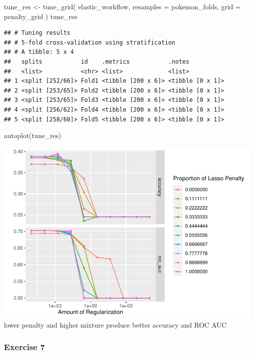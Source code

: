 \documentclass[
]{article}
\newenvironment{Shaded}{\begin{snugshade}}{\end{snugshade}}
\newcommand{\AttributeTok}[1]{\textcolor[rgb]{0.77,0.63,0.00}{#1}}
\newcommand{\FunctionTok}[1]{\textcolor[rgb]{0.00,0.00,0.00}{#1}}
\newcommand{\NormalTok}[1]{#1}
\newcommand{\OtherTok}[1]{\textcolor[rgb]{0.56,0.35,0.01}{#1}}
\begin{document}
\begin{Shaded}
\begin{Highlighting}[]
\NormalTok{tune\_res }\OtherTok{\textless{}{-}} \FunctionTok{tune\_grid}\NormalTok{(}
\NormalTok{  elastic\_workflow,}
  \AttributeTok{resamples =}\NormalTok{ pokemon\_folds, }
  \AttributeTok{grid =}\NormalTok{ penalty\_grid}
\NormalTok{)}
\NormalTok{tune\_res}
\end{Highlighting}
\end{Shaded}

\begin{verbatim}
## # Tuning results
## # 5-fold cross-validation using stratification 
## # A tibble: 5 x 4
##   splits           id    .metrics           .notes          
##   <list>           <chr> <list>             <list>          
## 1 <split [252/66]> Fold1 <tibble [200 x 6]> <tibble [0 x 1]>
## 2 <split [253/65]> Fold2 <tibble [200 x 6]> <tibble [0 x 1]>
## 3 <split [253/65]> Fold3 <tibble [200 x 6]> <tibble [0 x 1]>
## 4 <split [256/62]> Fold4 <tibble [200 x 6]> <tibble [0 x 1]>
## 5 <split [258/60]> Fold5 <tibble [200 x 6]> <tibble [0 x 1]>
\end{verbatim}

\begin{Shaded}
\begin{Highlighting}[]
\FunctionTok{autoplot}\NormalTok{(tune\_res)}
\end{Highlighting}
\end{Shaded}

\includegraphics{PSTAT131HW05_files/figure-latex/unnamed-chunk-11-1.pdf}
lower penalty and higher mixture produce better accuracy and ROC AUC

\hypertarget{exercise-7}{%
\subsubsection{Exercise 7}\label{exercise-7}}
\end{document}
